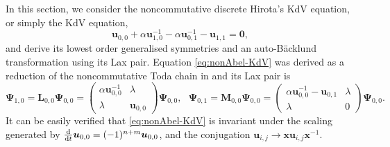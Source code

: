 \documentclass[dvips,10pt]{article}
\newcommand{\bs}{\boldsymbol}
\newcommand{\bsu}{ {\bs{u}}}
\newcommand{\bsx}{ {\bs{x}}}
\theoremstyle{remark} %
\begin{document}
	In this section, we consider the noncommutative discrete Hirota's KdV equation, or simply the KdV equation,	
	\begin{equation} \label{eq:nonAbel-KdV}
		{\bs{u}}_{0,0} + \alpha {\bs{u}}_{1,0}^{-1} - \alpha {\bs{u}}_{0,1}^{-1}-{\bs{u}}_{1,1} = {\bs{0}}, 
	\end{equation}
	and derive its lowest order generalised symmetries and an auto-B\"acklund transformation using its Lax pair. Equation \eqref{eq:nonAbel-KdV} was derived as a reduction of the noncommutative Toda chain in \cite{Betal} and its Lax pair is
	\begin{equation} \label{eq:Lax-KdV}
		{\bs{\Psi}}_{1,0} = {\bs{L}}_{0,0} {\bs{\Psi}}_{0,0} =   \begin{pmatrix}
			\alpha \bsu_{0,0}^{-1} & \lambda  \\ \lambda &  \bsu_{0,0}
		\end{pmatrix} {\bs{\Psi}}_{0,0}, ~~~ 
		{\bs{\Psi}}_{0,1} = {\bs{M}}_{0,0} {\bs{\Psi}}_{0,0} = \begin{pmatrix}
			\alpha \bsu_{0,0}^{-1} - \bsu_{0,1} & \lambda  \\ \lambda & 0
		\end{pmatrix} {\bs{\Psi}}_{0,0}.
	\end{equation}
	It can be easily verified that \eqref{eq:nonAbel-KdV} is invariant under the scaling generated by 	$\tfrac{\rm{d}}{{\rm{d}} t} \bsu_{0,0} = (-1)^{n+m} \bsu_{0,0}$, and the conjugation $\bsu_{i,j} \rightarrow \bsx \bsu_{i,j} \bsx^{-1}$.
	
\end{document}
